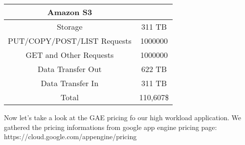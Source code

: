 \documentclass{article}
\begin{document}
\begin{center}

   \begin{tabular}{ | c | c | }

     \hline

     Amazon S3 &  \\ \hline

     Storage & 311 TB \\ \hline

     PUT/COPY/POST/LIST Requests & 1000000 \\ \hline

     GET and Other Requests & 1000000\\ \hline

     Data Transfer Out & 622 TB \\ \hline

     Data Transfer In & 311 TB\\ \hline

     Total & 110,607\$ \\

     \hline

   \end{tabular}

 \end{center}

 

Now let's take a look at the GAE pricing fo our high workload application. We gathered the pricing informations from google app engine pricing page:  https://cloud.google.com/appengine/pricing\\
\end{document}
